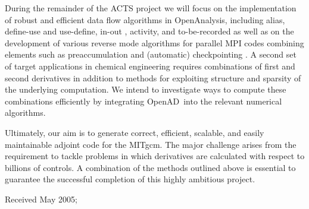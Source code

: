\documentclass[acmtocl,acmnow]{acmtrans2m}
\newcommand{\OpenAD}{OpenAD}
\newcommand{\OpenAnalysis}{OpenAnalysis}
\begin{document}
During the remainder of the ACTS project we will focus on the implementation
of robust and efficient data flow algorithms in \OpenAnalysis, including alias, 
define-use and use-define, in-out \cite{Muc97}, 
activity, and to-be-recorded \cite{HNP02} as well as on 
the development of various reverse mode algorithms for parallel MPI codes
combining elements such as preaccumulation and (automatic) checkpointing
\cite{Gri92}. 
A second set of target 
applications in chemical engineering \cite{FTB97} requires combinations of first and 
second derivatives in addition to methods for exploiting structure and sparsity
of the underlying computation. We intend to investigate ways to compute these
combinations efficiently by integrating \OpenAD\ into the relevant 
numerical algorithms.

Ultimately, our aim is to generate correct, efficient, scalable, and easily 
maintainable adjoint code for the MITgcm. The major challenge arises from the
requirement to tackle problems in which derivatives are calculated with respect 
to billions of controls. A combination of the methods outlined above is 
essential to guarantee the successful completion of this highly ambitious
project.






\begin{received}
Received May 2005;
\end{received}
\end{document}
